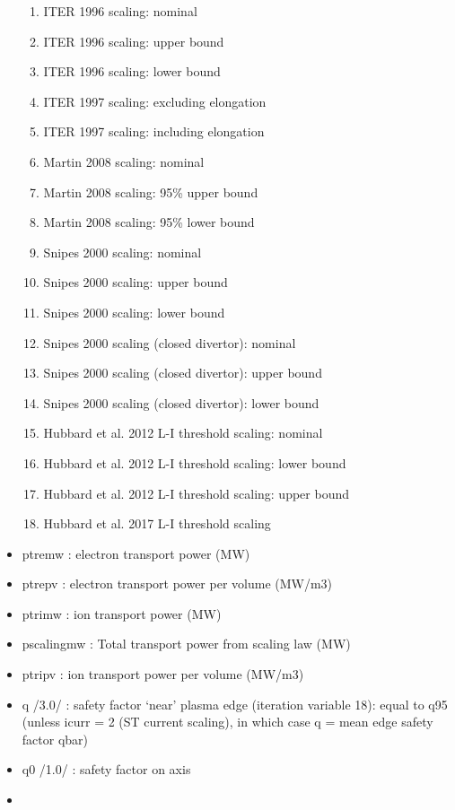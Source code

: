 \documentclass[]{article}
\providecommand{\tightlist}{%
  \setlength{\itemsep}{0pt}\setlength{\parskip}{0pt}}
\begin{document}
\begin{itemize}
  \begin{enumerate}
  \tightlist
  \item
    ITER 1996 scaling: nominal
  \item
    ITER 1996 scaling: upper bound
  \item
    ITER 1996 scaling: lower bound
  \item
    ITER 1997 scaling: excluding elongation
  \item
    ITER 1997 scaling: including elongation
  \item
    Martin 2008 scaling: nominal
  \item
    Martin 2008 scaling: 95\% upper bound
  \item
    Martin 2008 scaling: 95\% lower bound
  \item
    Snipes 2000 scaling: nominal
  \item
    Snipes 2000 scaling: upper bound
  \item
    Snipes 2000 scaling: lower bound
  \item
    Snipes 2000 scaling (closed divertor): nominal
  \item
    Snipes 2000 scaling (closed divertor): upper bound
  \item
    Snipes 2000 scaling (closed divertor): lower bound
  \item
    Hubbard et al. 2012 L-I threshold scaling: nominal
  \item
    Hubbard et al. 2012 L-I threshold scaling: lower bound
  \item
    Hubbard et al. 2012 L-I threshold scaling: upper bound
  \item
    Hubbard et al. 2017 L-I threshold scaling
  \end{enumerate}
\item
  ptremw : electron transport power (MW)
\item
  ptrepv : electron transport power per volume (MW/m3)
\item
  ptrimw : ion transport power (MW)
\item
  pscalingmw : Total transport power from scaling law (MW)
\item
  ptripv : ion transport power per volume (MW/m3)
\item
  q /3.0/ : safety factor `near' plasma edge (iteration variable 18):
  equal to q95 (unless icurr = 2 (ST current scaling), in which case q =
  mean edge safety factor qbar)
\item
  q0 /1.0/ : safety factor on axis
\item

\end{itemize}
\end{document}
